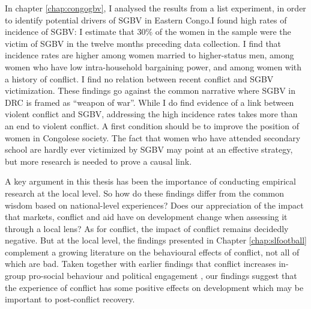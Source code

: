 In chapter \ref{chap:congogbv}, I analysed the results from a list experiment, in order to identify potential drivers {}of SGBV in Eastern Congo.I found high rates of incidence of SGBV: I estimate that 30\% of the women in the sample were the victim of SGBV in the twelve months preceding data collection. I find that incidence rates are higher among women married to higher-status men, among women who have low intra-household bargaining power, and among women with a history of conflict. I find no relation between recent conflict and SGBV victimization. These findings go against the common narrative where SGBV in DRC is framed as ``weapon of war''. While I do find evidence of a link between violent conflict and SGBV, addressing the high incidence rates takes more than an end to violent conflict. A first condition should be to improve the position of women in Congolese society. The fact that women who have attended secondary school are hardly ever victimized by SGBV may point at an effective strategy, but more research is needed to prove a causal link.

A key argument in this thesis has been the importance of conducting empirical research at the local level. So how do these findings differ from the common wisdom based on national-level experiences? Does our appreciation of the impact that markets, conflict and aid have on development change when assessing it through a local lens? As for conflict, the impact of conflict remains decidedly negative. But at the local level, the findings presented in Chapter \ref{chap:slfootball} complement a growing literature on the behavioural effects of conflict, not all of which are bad. Taken together with earlier findings that conflict increases in-group pro-social behaviour \cite{Bellows2009b,Voors2012,Gilligan2014,Bauer2014} and political engagement \cite{Bellows2009b,Blattman2009a}, our findings suggest that the experience of conflict has some positive effects on development which may be important to post-conflict recovery.

